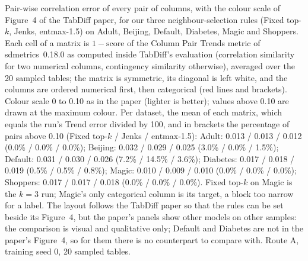 Pair-wise correlation error of every pair of columns, with the colour scale of Figure~4 of the TabDiff paper, for our three neighbour-selection rules (Fixed top-$k$, Jenks, entmax-1.5) on Adult, Beijing, Default, Diabetes, Magic and Shoppers. Each cell of a matrix is $1-\text{score}$ of the Column Pair Trends metric of sdmetrics~0.18.0 as computed inside TabDiff's evaluation (correlation similarity for two numerical columns, contingency similarity otherwise), averaged over the 20 sampled tables; the matrix is symmetric, its diagonal is left white, and the columns are ordered numerical first, then categorical (red lines and brackets). Colour scale 0 to 0.10 as in the paper (lighter is better); values above 0.10 are drawn at the maximum colour. Per dataset, the mean of each matrix, which equals the run's Trend error divided by 100, and in brackets the percentage of pairs above 0.10 (Fixed top-$k$ / Jenks / entmax-1.5): Adult: 0.013 / 0.013 / 0.012 (0.0\% / 0.0\% / 0.0\%); Beijing: 0.032 / 0.029 / 0.025 (3.0\% / 0.0\% / 1.5\%); Default: 0.031 / 0.030 / 0.026 (7.2\% / 14.5\% / 3.6\%); Diabetes: 0.017 / 0.018 / 0.019 (0.5\% / 0.5\% / 0.8\%); Magic: 0.010 / 0.009 / 0.010 (0.0\% / 0.0\% / 0.0\%); Shoppers: 0.017 / 0.017 / 0.018 (0.0\% / 0.0\% / 0.0\%). Fixed top-$k$ on Magic is the $k=3$ run; Magic's only categorical column is its target, a block too narrow for a label. The layout follows the TabDiff paper so that the rules can be set beside its Figure~4, but the paper's panels show other models on other samples: the comparison is visual and qualitative only; Default and Diabetes are not in the paper's Figure~4, so for them there is no counterpart to compare with. Route A, training seed 0, 20 sampled tables.
